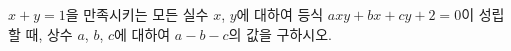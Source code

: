 $x+y=1$을 만족시키는 모든 실수 $x$, $y$에 대하여 등식 $axy+bx+cy+2=0$이 성립할 때, 상수 $a$, $b$, $c$에 대하여 $a-b-c$의 값을 구하시오.
